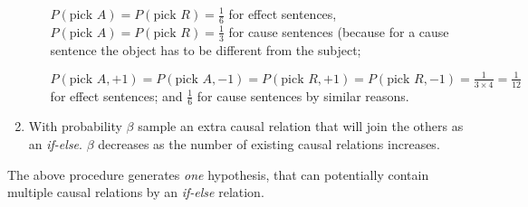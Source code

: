 \documentclass[11pt]{article}
\begin{document}
\begin{enumerate}
\begin{enumerate}
	$P(\text{pick }A) = P(\text{pick }R) = \frac{1}{6}$ for effect sentences,
	$P(\text{pick }A) = P(\text{pick }R) = \frac{1}{3}$ for cause sentences 
	(because for a cause sentence the object has to be different from the subject;

	$P(\text{pick }A, +1) = P(\text{pick }A, -1) = P(\text{pick }R, +1) = P(\text{pick }R, -1) = \frac{1}{3 \times 4} = \frac{1}{12}$ for effect sentences;
	and $\frac{1}{6}$ for cause sentences by similar reasons.


\end{enumerate}



\item With probability $\beta$ sample an extra causal relation
that will join the others as an \textit{if-else}.
$\beta$ decreases as the number of existing causal relations increases.

\end{enumerate} 

The above procedure generates \textit{one} hypothesis, 
that can potentially contain multiple causal relations by an \textit{if-else} relation.
















\end{document}
